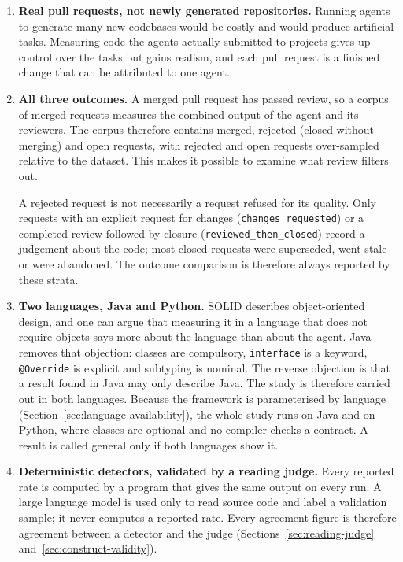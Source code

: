 \begin{enumerate}
  \item \textbf{Real pull requests, not newly generated repositories.} Running agents to generate
  many new codebases would be costly and would produce artificial tasks. Measuring code the agents
  actually submitted to projects gives up control over the tasks but gains realism, and each pull
  request is a finished change that can be attributed to one agent.
  \item \textbf{All three outcomes.} A merged pull request has passed review, so a corpus of merged
  requests measures the combined output of the agent and its reviewers. The corpus therefore
  contains merged, rejected (closed without merging) and open requests, with rejected and open
  requests over-sampled relative to the dataset. This makes it possible to examine what review
  filters out.

  A rejected request is not necessarily a request refused for its quality. Only requests with an
  explicit request for changes (\texttt{changes\_requested}) or a completed review followed by
  closure (\texttt{reviewed\_then\_closed}) record a judgement about the code; most closed requests
  were superseded, went stale or were abandoned. The outcome comparison is therefore always
  reported by these strata.
  \item \textbf{Two languages, Java and Python.} SOLID describes object-oriented design, and one can
  argue that measuring it in a language that does not require objects says more about the language
  than about the agent. Java removes that objection: classes are compulsory, \texttt{interface} is a
  keyword, \texttt{@Override} is explicit and subtyping is nominal. The reverse objection is that a
  result found in Java may only describe Java. The study is therefore carried out in both languages.
  Because the framework is parameterised by language (Section~\ref{sec:language-availability}), the
  whole study runs on Java and on Python, where classes are optional and no compiler checks a
  contract. A result is called general only if both languages show it.
  \item \textbf{Deterministic detectors, validated by a reading judge.} Every reported rate is
  computed by a program that gives the same output on every run. A large language model is used only
  to read source code and label a validation sample; it never computes a reported rate. Every
  agreement figure is therefore agreement between a detector and the judge
  (Sections~\ref{sec:reading-judge} and~\ref{sec:construct-validity}).
\end{enumerate}


